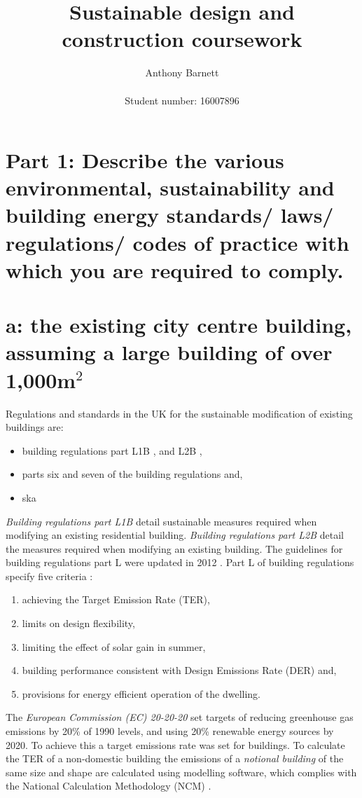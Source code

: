 \documentclass[a4paper,fleqn]{article}
\author{Anthony Barnett
\\
\\Student number: 16007896}
\title{Sustainable design and construction coursework}
\date{}
\let\stdsection\section
\renewcommand{\section}{\newpage\stdsection}
\renewcommand{\cite}{\citep}
\begin{document}
\maketitle
\section*{Part 1: Describe the various environmental, sustainability and building energy standards/
	laws/ regulations/ codes of practice with which you are required to comply.}
\stdsection*{a: the existing city centre building, assuming a large building of over 1,000m$^2$}

Regulations and standards in the UK for the sustainable modification of existing buildings are:
\begin{itemize}
	\item building regulations part L1B \cite{Communities&LocalGovernment2010a}, and  
		L2B \cite{Communities&LocalGovernment2010c}, 
	\item parts six and seven of the building regulations \cite{Stunell2010} and, 
	\item ska \cite{Brown2013}
\end{itemize}

\emph{Building regulations part L1B} detail sustainable measures required when modifying 
an existing residential building. \emph{Building regulations part L2B} detail the measures 
required when modifying an existing building. The guidelines for building 
regulations part L were updated in 2012 \cite{Communities&LocalGovernment2013}. Part L of 
building regulations specify five criteria \cite{RichardsPartingtonArchitects2011}:
\begin{enumerate}
	\item achieving the Target Emission Rate (TER), 
	\item limits on design flexibility, 
	\item limiting the effect of solar gain in summer, 
	\item building performance consistent with Design Emissions Rate (DER) and, 
	\item provisions for energy efficient operation of the dwelling. 
\end{enumerate}

The \emph{European Commission (EC) 20-20-20} set targets of reducing greenhouse gas emissions by 20\% of 1990 
levels, and using 20\% renewable energy sources by 2020. To achieve this a target emissions rate was set for 
buildings. To calculate the TER of a non-domestic building the emissions of a \emph{notional building} of the 
same size and shape are calculated using modelling software, which complies with the National Calculation 
Methodology (NCM) \cite{Communities&LocalGovernment2008}.
\end{document}
